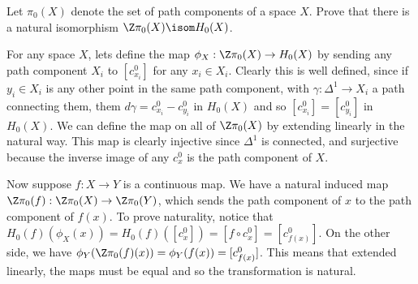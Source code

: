 \documentclass[11pt,letterpaper]{article}
\begin{document}
\begin{problem}
    Let $\pi_0(X)$ denote the set of path components of a space $X$. Prove that there is a natural isomorphism $\Z\pi_0(X) \isom H_0(X)$.
\end{problem}

\begin{solution}
    For any space $X$, lets define the map $\phi_X : \Z\pi_0(X) \to H_0(X)$ by sending any path component $X_i$ to $[c_{x_i}^0]$ for any $x_i\in X_i$. Clearly this is well defined, since if $y_i\in X_i$ is any other point in the same path component, with $\gamma : \Delta^1 \to X_i$ a path connecting them, them $d\gamma = c_{x_i}^0 - c_{y_i}^0$ in $H_0(X)$ and so $[c_{x_i}^0]=[c_{y_i}^0]$ in $H_0(X)$. We can define the map on all of $\Z\pi_0(X)$ by extending linearly in the natural way. This map is clearly injective since $\Delta^1$ is connected, and surjective because the inverse image of any $c_{x}^0$ is the path component of $X$.

    Now suppose $f : X \to Y$ is a continuous map. We have a natural induced map $\Z\pi_0(f) : \Z\pi_0(X) \to \Z\pi_0(Y)$, which sends the path component of $x$ to the path component of $f(x)$. To prove naturality, notice that $H_0(f)(\phi_X(x))=H_0(f)([c_x^0])=[f\circ c_x^0]=[c_{f(x)}^0]$. On the other side, we have $\phi_Y(\Z\pi_0(f)(x))=\phi_Y(f(x))=[c_{f(x)}^0]$. This means that extended linearly, the maps must be equal and so the transformation is natural.
\end{solution}
\end{document}
